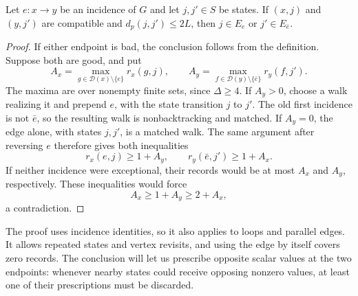 \begin{lemma}\label{lem:exceptional-directions}
Let $e:x\to y$ be an incidence of $G$ and let $j,j'\in S$ be states.
If $(x,j)$ and $(y,j')$
are compatible and $d_p(j,j')\le2L$, then
$j\in E_e$ or $j'\in E_{\bar e}$.
\end{lemma}

\begin{proof}
If either endpoint is bad, the conclusion follows from the definition.
Suppose both are good, and put
\[
 A_x=\max_{g\in\mathcal D(x)\setminus\{e\}}r_x(g,j),
 \qquad
 A_y=\max_{f\in\mathcal D(y)\setminus\{\bar e\}}r_y(f,j').
\]
The maxima are over nonempty finite sets, since $\Delta\ge4$. If
$A_y>0$, choose a walk
realizing it and prepend $e$, with the state transition $j$ to $j'$.
The old first incidence is not $\bar e$, so the resulting walk is
nonbacktracking and matched. If $A_y=0$, the edge alone, with states
$j,j'$, is a matched walk. The same argument after reversing $e$
therefore gives both inequalities
\begin{equation}\label{eq:record-inequalities}
 r_x(e,j)\ge1+A_y,\qquad r_y(\bar e,j')\ge1+A_x.
\end{equation}
If neither incidence were exceptional, their records would be at
most $A_x$ and $A_y$, respectively. These inequalities would force
\[
 A_x\ge1+A_y\ge2+A_x,
\]
a contradiction.
\end{proof}

The proof uses incidence identities, so it also applies to loops and
parallel edges. It allows repeated states and vertex revisits, and using
the edge by itself covers zero records. The conclusion will let us
prescribe opposite scalar values at the two endpoints: whenever nearby
states could receive opposing nonzero values, at least one of their
prescriptions must be discarded.
